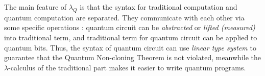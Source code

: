 The main feature of $\lambda_Q$ is that the syntax for traditional computation and quantum computation are separated.
They communicate with each other via some specific operations : quantum circuit can be \textit{abstracted} or \textit{lifted (measured)} into traditional term, and traditional term for quantum circuit can be applied to quantum bits.
Thus, the syntax of quantum circuit can use \textit{linear type system} to guarantee that the Quantum Non-cloning Theorem is not violated, meanwhile the $\lambda$-calculus of the traditional part makes it easier to write quantum programs.
